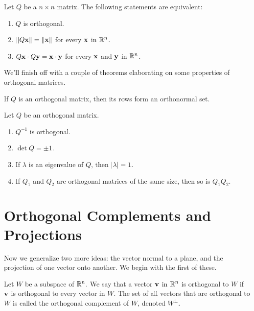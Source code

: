 \documentclass[../m73main.tex]{subfiles}
\begin{document}
\begin{theorem}
	Let $Q$ be a $n \times n$ matrix.
	The following statements are equivalent:
	\begin{enumerate}[label=(\alph*)]
		\item $Q$ is orthogonal.
		\item $\|Q \mathbf{x}\| = \|\mathbf{x}\|$ for every $\mathbf{x}$ in $\mathbb{R}^n$.
		\item $Q \mathbf{x} \cdot Q \mathbf{y} = \mathbf{x} \cdot \mathbf{y}$ for every $\mathbf{x}$ and $\mathbf{y}$ in $\mathbb{R}^n$.
	\end{enumerate}
\end{theorem}

We'll finish off with a couple of theorems elaborating on some properties of orthogonal matrices.

\begin{theorem}
	If $Q$ is an orthogonal matrix, then its rows form an orthonormal set.
\end{theorem}

\begin{theorem}
	Let $Q$ be an orthogonal matrix.
	\begin{enumerate}[label=(\alph*)]
		\item $Q^{-1}$ is orthogonal.
		\item $\det Q = \pm 1$.
		\item If $\lambda$ is an eigenvalue of $Q$, then $|\lambda| = 1$.
		\item If $Q_1$ and $Q_2$ are orthogonal matrices of the same size, then so is $Q_1 Q_2$.
	\end{enumerate}
\end{theorem}

\section{Orthogonal Complements and Projections}
Now we generalize two more ideas: the vector normal to a plane, and the projection of one vector onto another.           
We begin with the first of these.

\begin{definition}
	Let $W$ be a subspace of $\mathbb{R}^n$.
	We say that a vector $\mathbf{v}$ in $\mathbb{R}^n$ is orthogonal to $W$ if $\mathbf{v}$ is orthogonal to every vector in $W$.
	The set of all vectors that are orthogonal to $W$ is called the orthogonal complement of $W$, denoted $W^\perp$.
\end{definition}
\end{document}

